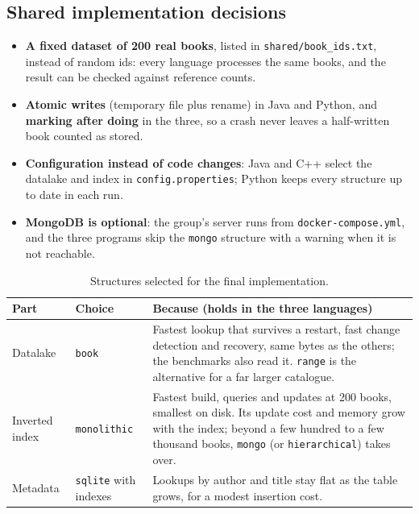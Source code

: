 \documentclass[11pt,a4paper]{article}
\newcommand{\code}[1]{\texttt{#1}}
\begin{document}
\subsection{Shared implementation decisions}
\begin{itemize}
  \item \textbf{A fixed dataset of 200 real books}, listed in \code{shared/book\_ids.txt}, instead of
        random ids: every language processes the same books, and the result can be checked against
        reference counts.
  \item \textbf{Atomic writes} (temporary file plus rename) in Java and Python, and \textbf{marking
        after doing} in the three, so a crash never leaves a half-written book counted as stored.
  \item \textbf{Configuration instead of code changes}: Java and C++ select the datalake and index in
        \code{config.properties}; Python keeps every structure up to date in each run.
  \item \textbf{MongoDB is optional}: the group's server runs from \code{docker-compose.yml}, and the
        three programs skip the \code{mongo} structure with a warning when it is not reachable.
\end{itemize}

\begin{table}[H]
\centering\small
\begin{tabularx}{\linewidth}{@{}L{2.4cm} L{3.0cm} Y@{}}
\toprule
Part & Choice & Because (holds in the three languages) \\
\midrule
Datalake & \code{book} & Fastest lookup that survives a restart, fast change detection and recovery, same bytes as the others; the benchmarks also read it. \code{range} is the alternative for a far larger catalogue. \\
Inverted index & \code{monolithic} & Fastest build, queries and updates at 200 books, smallest on disk. Its update cost and memory grow with the index; beyond a few hundred to a few thousand books, \code{mongo} (or \code{hierarchical}) takes over. \\
Metadata & \code{sqlite} with indexes & Lookups by author and title stay flat as the table grows, for a modest insertion cost. \\
\bottomrule
\end{tabularx}
\caption{Structures selected for the final implementation.}
\label{tab:selected}
\end{table}

\end{document}
